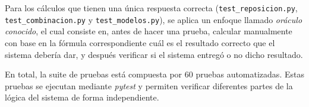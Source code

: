 Para los cálculos que tienen una única respuesta correcta (\texttt{test\_reposicion.py}, \texttt{test\_combinacion.py} y \texttt{test\_modelos.py}), se aplica un enfoque llamado \textit{oráculo conocido}, el cual consiste en, antes de hacer una prueba, calcular manualmente con base en la fórmula correspondiente cuál es el resultado correcto que el sistema debería dar, y después verificar si el sistema entregó o no dicho resultado.

En total, la suite de pruebas está compuesta por 60 pruebas automatizadas. Estas pruebas se ejecutan mediante \textit{pytest} y permiten verificar diferentes partes de la lógica del sistema de forma independiente.